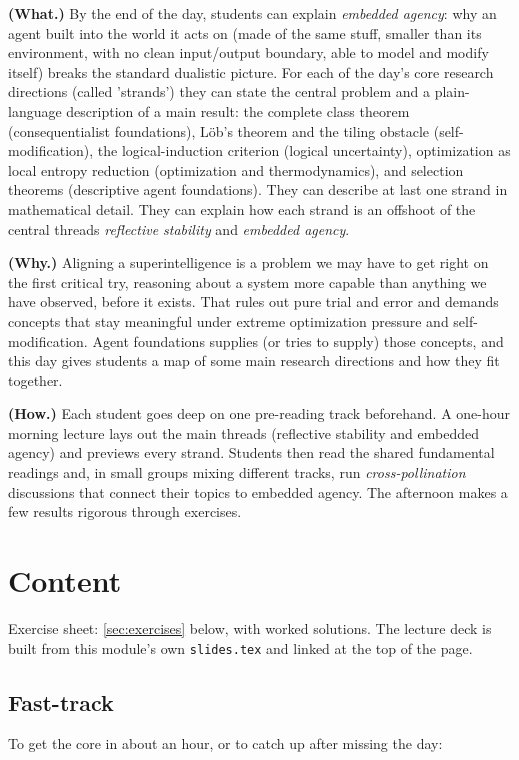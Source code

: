 \documentclass[11pt]{article}
\begin{document}
\begin{learningoutcomes}
\textbf{(What.)} By the end of the day, students can explain \emph{embedded agency}: why an agent built into the world it acts on (made of the same stuff, smaller than its environment, with no clean input/output boundary, able to model and modify itself) breaks the standard dualistic picture. For each of the day's core research directions (called 'strands') they can state the central problem and a plain-language description of a main result: the complete class theorem (consequentialist foundations), Löb's theorem and the tiling obstacle (self-modification), the logical-induction criterion (logical uncertainty), optimization as local entropy reduction (optimization and thermodynamics), and selection theorems (descriptive agent foundations). They can describe at last one strand in mathematical detail. They can explain how each strand is an offshoot of the central threads \emph{reflective stability} and \emph{embedded agency}.

\textbf{(Why.)} Aligning a superintelligence is a problem we may have to get right on the first critical try, reasoning about a system more capable than anything we have observed, before it exists. That rules out pure trial and error and demands concepts that stay meaningful under extreme optimization pressure and self-modification. Agent foundations supplies (or tries to supply) those concepts, and this day gives students a map of some main research directions and how they fit together.

\textbf{(How.)} Each student goes deep on one pre-reading track beforehand. A one-hour morning lecture lays out the main threads (reflective stability and embedded agency) and previews every strand. Students then read the shared fundamental readings and, in small groups mixing different tracks, run \emph{cross-pollination} discussions that connect their topics to embedded agency. The afternoon makes a few results rigorous through exercises.
\end{learningoutcomes}

\section{Content}
Exercise sheet: \cref{sec:exercises} below, with worked solutions. The lecture deck is built from this module's own \texttt{slides.tex} and linked at the top of the page.

\subsection{Fast-track}
To get the core in about an hour, or to catch up after missing the day:
\end{document}
